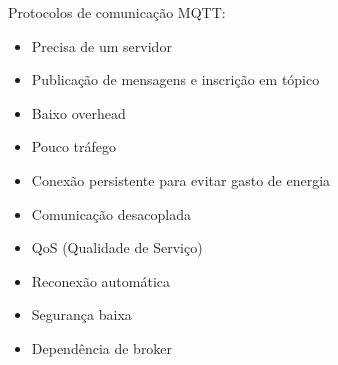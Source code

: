 \begin{frame}{Protocolos de comunicação}
    MQTT:
    \begin{itemize}
        \item Precisa de um servidor
        \item Publicação de mensagens e inscrição em tópico
        \item Baixo overhead
        \item Pouco tráfego
        \item Conexão persistente para evitar gasto de energia
        \item Comunicação desacoplada
        \item QoS (Qualidade de Serviço)
        \item Reconexão automática
        \item Segurança baixa
        \item Dependência de broker
    \end{itemize}
\end{frame}
